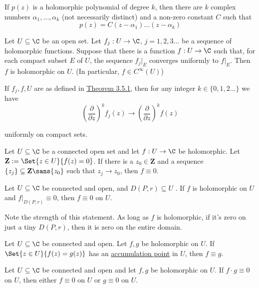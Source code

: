 \label{cae4be0}

If $p(z)$ is a holomorphic polynomial of degree $k$, then there are $k$ complex
numbers $\alpha_1,\ldots,\alpha_k$ (not necessarily distinct) and a non-zero
constant $C$ such that
$$
  p(z)=C(z-\alpha_1)\ldots(z-\alpha_k)
$$

\label{c4e6d08}

Let $U\subseteq\C$ be an open set. Let $f_j:U\to\C$, $j=1,2,3\ldots$ be a
sequence of holomorphic functions. Suppose that there is a function $f:U\to\C$
such that, for each compact subset $E$ of $U$, the sequence $f_j|_E$ converges
uniformly to $f|_E$. Then $f$ is holomorphic on $U$. (In particular, $f\in
C^\infty(U)$)

\label{f5163f1}

If $f_j,f,U$ are as defined in \href{c4e6d08}{Theorem 3.5.1}, then for any
integer $k\in\{0,1,2\ldots\}$ we have
$$
  \left(\frac\partial{\partial z}\right)^kf_j(z)\to\left(\frac\partial{\partial z}\right)^kf(z)
$$

uniformly on compact sets.

\label{bdc2857}

Let $U\subseteq\C$ be a connected open set and let $f:U\to\C$ be holomorphic.
Let $\mathbf Z:=\Set{z\in U}{f(z)=0}$. If there is a $z_0\in\mathbf Z$ and a
sequence $\{z_j\}\subseteq\mathbf Z\sans{z_0}$ such that $z_j\to z_0$, then
$f\equiv0$.

\label{b919101}

Let $U\subseteq\C$ be connected and open, and $D(P,r)\subseteq U$ . If $f$ is
holomorphic on $U$ and $f|_{D(P,r)}\equiv0$, then $f\equiv0$ on $U$.

Note the strength of this statement. As long as $f$ is holomorphic, if it's
zero on just a tiny $D(P,r)$, then it is zero on the entire domain.

\label{ac6f6ea}

Let $U\subseteq\C$ be connected and open. Let $f,g$ be holomorphic on $U$. If
$\Set{z\in U}{f(z)=g(z)}$ has an \href{b0219cd}{accumulation point} in $U$,
then $f\equiv g$.

\label{faf57f7}

Let $U\subseteq\C$ be connected and open and let $f,g$ be holomorphic on $U$.
If $f\cdot g\equiv0$ on $U$, then either $f\equiv0$ on $U$ or $g\equiv0$ on
$U$.

\label{dccfe6b}

